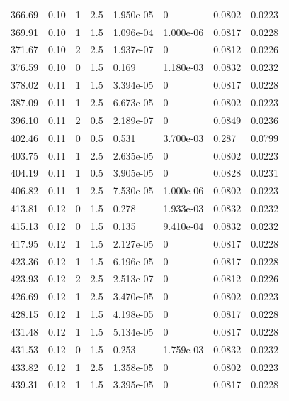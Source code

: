 \documentclass[preview]{standalone}
\begin{document}
{{{\begin{tabular}{L{1.2cm}C{1.2cm} C{0.3cm}C{0.5cm} C{1.4cm}C{1.4cm} C{1.4cm}C{1.4cm}}
  366.69  &  0.10  & 1     & 2.5 &  1.950e-05  & 0  & 0.0802 &  0.0223   \\ 
  369.91  &  0.10  & 1     & 1.5 &  1.096e-04  & 1.000e-06  & 0.0817 &  0.0228   \\ 
  371.67  &  0.10  & 2     & 2.5 &  1.937e-07  & 0  & 0.0812 &  0.0226   \\ 
  376.59  &  0.10  & 0     & 1.5 &  0.169  & 1.180e-03  & 0.0832 &  0.0232   \\ 
  378.02  &  0.11  & 1     & 1.5 &  3.394e-05  & 0  & 0.0817 &  0.0228   \\ 
  387.09  &  0.11  & 1     & 2.5 &  6.673e-05  & 0  & 0.0802 &  0.0223   \\ 
  396.10  &  0.11  & 2     & 0.5 &  2.189e-07  & 0  & 0.0849 &  0.0236   \\ 
  402.46  &  0.11  & 0     & 0.5 &  0.531  & 3.700e-03  & 0.287 &  0.0799   \\ 
  403.75  &  0.11  & 1     & 2.5 &  2.635e-05  & 0  & 0.0802 &  0.0223   \\ 
  404.19  &  0.11  & 1     & 0.5 &  3.905e-05  & 0  & 0.0828 &  0.0231   \\ 
  406.82  &  0.11  & 1     & 2.5 &  7.530e-05  & 1.000e-06  & 0.0802 &  0.0223   \\ 
  413.81  &  0.12  & 0     & 1.5 &  0.278  & 1.933e-03  & 0.0832 &  0.0232   \\ 
  415.13  &  0.12  & 0     & 1.5 &  0.135  & 9.410e-04  & 0.0832 &  0.0232   \\ 
  417.95  &  0.12  & 1     & 1.5 &  2.127e-05  & 0  & 0.0817 &  0.0228   \\ 
  423.36  &  0.12  & 1     & 1.5 &  6.196e-05  & 0  & 0.0817 &  0.0228   \\ 
  423.93  &  0.12  & 2     & 2.5 &  2.513e-07  & 0  & 0.0812 &  0.0226   \\ 
  426.69  &  0.12  & 1     & 2.5 &  3.470e-05  & 0  & 0.0802 &  0.0223   \\ 
  428.15  &  0.12  & 1     & 1.5 &  4.198e-05  & 0  & 0.0817 &  0.0228   \\ 
  431.48  &  0.12  & 1     & 1.5 &  5.134e-05  & 0  & 0.0817 &  0.0228   \\ 
  431.53  &  0.12  & 0     & 1.5 &  0.253  & 1.759e-03  & 0.0832 &  0.0232   \\ 
  433.82  &  0.12  & 1     & 2.5 &  1.358e-05  & 0  & 0.0802 &  0.0223   \\ 
  439.31  &  0.12  & 1     & 1.5 &  3.395e-05  & 0  & 0.0817 &  0.0228   \\ 

\end{tabular}}}}
\end{document}
